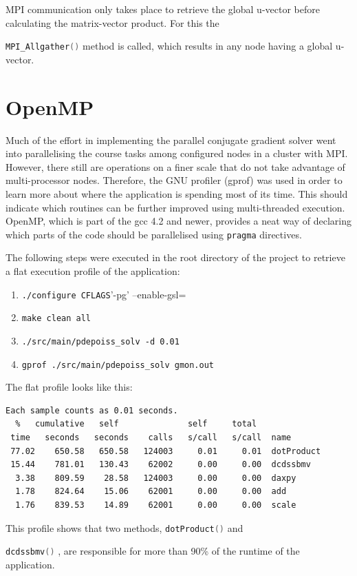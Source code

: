 \documentclass[12pt,a4paper]{report}
\def\ccode#1{
  \lstinline[basicstyle=\ttfamily,language=C]{#1} }
\begin{document}
MPI communication only takes place to retrieve the global u-vector
before calculating the matrix-vector product. For this the
\ccode{MPI_Allgather()} method is called, which results in any node
having a global u-vector.

\section{OpenMP}
\label{sec:openmp}

Much of the effort in implementing the parallel conjugate gradient
solver went into parallelising the course tasks among configured nodes
in a cluster with MPI. However, there still are operations on a finer
scale that do not take advantage of multi-processor nodes. Therefore,
the GNU profiler (gprof) was used in order to learn more about where
the application is spending most of its time. This should indicate
which routines can be further improved using multi-threaded
execution. OpenMP, which is part of the gcc 4.2 and newer, provides a
neat way of declaring which parts of the code should be parallelised
using \ccode{pragma} directives.

The following steps were executed in the root directory of the project
to retrieve a flat execution profile of the application:

\begin{enumerate}
\item \verb=./configure CFLAGS='-pg' --enable-gsl=
\item \verb=make clean all=
\item \verb=./src/main/pdepoiss_solv -d 0.01=
\item \verb=gprof ./src/main/pdepoiss_solv gmon.out=
\end{enumerate}

The flat profile looks like this:
\begin{verbatim}
Each sample counts as 0.01 seconds.
  %   cumulative   self              self     total
 time   seconds   seconds    calls   s/call   s/call  name
 77.02    650.58   650.58   124003     0.01     0.01  dotProduct
 15.44    781.01   130.43    62002     0.00     0.00  dcdssbmv
  3.38    809.59    28.58   124003     0.00     0.00  daxpy
  1.78    824.64    15.06    62001     0.00     0.00  add
  1.76    839.53    14.89    62001     0.00     0.00  scale
\end{verbatim}

This profile shows that two methods, \ccode{dotProduct()} and
\ccode{dcdssbmv()}, are responsible for more than 90\% of the runtime of
the application.
\end{document}
